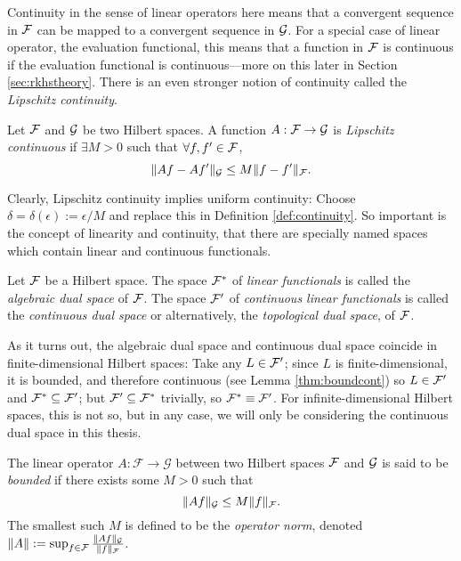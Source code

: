 Continuity in the sense of linear operators here means that a convergent sequence in ${\mathcal F}$ can be mapped to a convergent sequence in ${\mathcal G}$.
For a special case of linear operator, the evaluation functional, this means that a function in ${\mathcal F}$ is continuous if the evaluation functional is continuous---more on this later in Section \ref{sec:rkhstheory}.
There is an even stronger notion of continuity called the \emph{Lipschitz continuity}.

\begin{definition}
  Let ${\mathcal F}$ and ${\mathcal G}$ be two Hilbert spaces.  
  A function $A:{\mathcal F}\to{\mathcal G}$ is \emph{Lipschitz continuous} if $\exists M >0$ such that $\forall f,f'\in{\mathcal F}$,
  \[
    \lVert Af - Af'\rVert_{\mathcal G} \leq M \lVert f - f'\rVert_{\mathcal F}.
  \]
\end{definition}

Clearly, Lipschitz continuity implies uniform continuity: Choose $\delta = \delta(\epsilon) := \epsilon/M$ and replace this in Definition \ref{def:continuity}.
So important is the concept of linearity and continuity, that there are specially named spaces which contain linear and continuous functionals.

\begin{definition}
  Let ${\mathcal F}$ be a Hilbert space. 
  The space ${\mathcal F}^*$ of \emph{linear functionals} is called the \emph{algebraic dual space} of ${\mathcal F}$.
  The space ${\mathcal F}'$ of \emph{continuous linear functionals} is called the \emph{continuous dual space} or alternatively, the \emph{topological dual space}, of ${\mathcal F}$.   
\end{definition}

As it turns out, the algebraic dual space and continuous dual space coincide in finite-dimensional Hilbert spaces:
Take any $L\in{\mathcal F}'$; since $L$ is finite-dimensional, it is bounded, and therefore continuous (see Lemma \ref{thm:boundcont}) so $L\in{\mathcal F}'$ and ${\mathcal F}^* \subseteq {\mathcal F}'$; but ${\mathcal F}' \subseteq {\mathcal F}^*$ trivially, so ${\mathcal F}^* \equiv {\mathcal F}'$.
For infinite-dimensional Hilbert spaces, this is not so, but in any case, we will only be considering the continuous dual space in this thesis.

\begin{definition}\label{def:boundedop}
  The linear operator $A:\mathcal F \rightarrow \mathcal G$ between two Hilbert spaces ${\mathcal F}$ and ${\mathcal G}$ is said to be \emph{bounded} if there exists some $M>0$ such that
  \[
    \lVert Af\rVert_{\mathcal G} \leq M \lVert f\rVert_{\mathcal F}.
  \] 
  The smallest such $M$ is defined to be the \emph{operator norm}, denoted $\lVert A\rVert := \sup_{f\in{\mathcal F}} \frac{\lVert Af\rVert_{\mathcal G}}{\lVert f\rVert_{\mathcal F}}$.
\end{definition}

